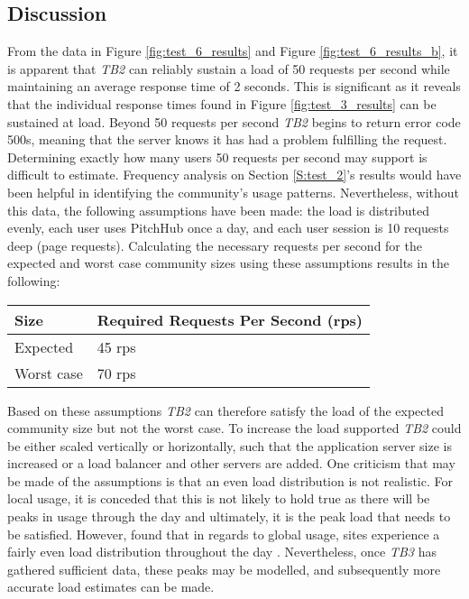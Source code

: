 \subsection{Discussion}
From the data in Figure \ref{fig:test_6_results} and Figure \ref{fig:test_6_results_b}, it is apparent that \textit{TB2} can reliably sustain a load of 50 requests per second while maintaining an average response time of 2 seconds. This is significant as it reveals that the individual response times found in Figure \ref{fig:test_3_results} can be sustained at load. Beyond 50 requests per second \textit{TB2} begins to return error code 500s, meaning that the server knows it has had a problem fulfilling the request.
Determining exactly how many users 50 requests per second may support is difficult to estimate. Frequency analysis on Section \ref{S:test_2}'s results would have been helpful in identifying the community's usage patterns. Nevertheless, without this data, the following assumptions have been made: the load is distributed evenly, each user uses PitchHub once a day, and each user session is 10 requests deep (page requests). Calculating the necessary requests per second for the expected and worst case community sizes using these assumptions results in the following:

\begin {table}[H]
\begin{center}
\begin{tabular}{ |p{2cm}||p{6cm}| }
 \hline
 Size & Required Requests Per Second (rps)\\
 \hline
    Expected & 45 rps\\
 \hline
    Worst case & 70 rps\\
 \hline
\end{tabular}
\end{center}
\end{table}
Based on these assumptions \textit{TB2} can therefore satisfy the load of the expected community size but not the worst case. To increase the load supported \textit{TB2} could be either scaled vertically or horizontally, such that the application server size is increased or a load balancer and other servers are added. 
One criticism that may be made of the assumptions is that an even load distribution is not realistic. For local usage, it is conceded that this is not likely to hold true as there will be peaks in usage through the day and ultimately, it is the peak load that needs to be satisfied. However, \citeauthor{Malleable_access} found that in regards to global usage, sites experience a fairly even load distribution throughout the day \cite{Malleable_access}. Nevertheless, once \textit{TB3} has gathered sufficient data, these peaks may be modelled, and subsequently more accurate load estimates can be made.
